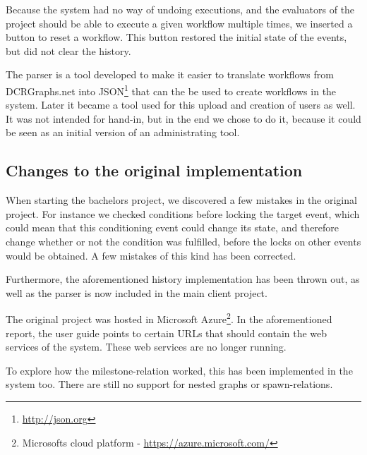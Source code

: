 		\newpar Because the system had no way of undoing executions, and the evaluators of the project should be able to execute a given workflow multiple times, we inserted a button to reset a workflow. This button restored the initial state of the events, but did not clear the history.
		
		\newpar The parser is a tool developed to make it easier to translate workflows from DCRGraphs.net into JSON\footnote{\url{http://json.org}} that can the be used to create workflows in the system. Later it became a tool used for this upload and creation of users as well. It was not intended for hand-in, but in the end we chose to do it, because it could be seen as an initial version of an administrating tool.
		
		\subsection{Changes to the original implementation}
			When starting the bachelors project, we discovered a few mistakes in the original project. For instance we checked conditions before locking the target event, which could mean that this conditioning event could change its state, and therefore change whether or not the condition was fulfilled, before the locks on other events would be obtained. A few mistakes of this kind has been corrected.
			
			\newpar Furthermore, the aforementioned history implementation has been thrown out, as well as the parser is now included in the main client project.

			\newpar The original project was hosted in Microsoft Azure\footnote{Microsofts cloud platform - \url{https://azure.microsoft.com/}}. In the aforementioned report, the user guide points to certain URLs that should contain the web services of the system. These web services are no longer running.
			
			\newpar To explore how the milestone-relation worked, this has been implemented in the system too. There are still no support for nested graphs or spawn-relations.